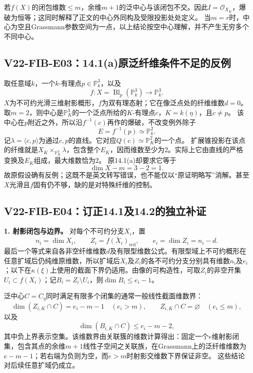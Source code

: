 \documentclass[UTF8,a4paper]{ctexbook}
\begin{document}
若$f(X)$的闭包维数$\leq m$，余维$m+1$的泛中心与该闭包不交。因此$I=\mathcal O_{X_K}$，爆破为恒等；这同时解释了正文的中心外同构及受限投影处处定义。
当$m=r$时，中心为空且Grassmann参数空间为一点，以上结论按空中心理解，并不产生无穷多个不同中心。

\subsection*{V22-FIB-E03：14.1(a)原泛纤维条件不足的反例}

取任意域$k$，一个$k$-有理点$p\in\mathbb P^3_k$，以及
\[
f:X=\operatorname{Bl}_p(\mathbb P^3_k)\longrightarrow\mathbb P^3_k.
\]
$X$为不可约光滑三维射影概形，$f$为双有理态射；它在像泛点处的纤维维数$d=0$。取$m=2$，则中心是$\mathbb P^3_K$的一个泛点所给的$K$-有理点$c$，$K=k(\eta)$，且$c\ne p$。
该中心在$p$附近之外，所以沿$f^{-1}(c)$再作的爆破，不改变例外除子
\[
E=f^{-1}(p)\simeq\mathbb P^2_k.
\]
记$\lambda=\langle c,p\rangle$为通过$c,p$的直线。它对应$Q(c)\simeq\mathbb P^2_K$的一个点。
扩展锥投影在该点的纤维就是$X_K\times_{\mathbb P^3_K}\lambda$，包含整个$E_K$，因而维数至少为2。实际上它由直线的严格变换及$E_K$组成，最大维数恰为2。
原14.1(a)却要求它等于
\[
\dim X-m=3-2=1.
\]
故原假设确有反例；这既不是英文转写错误，也不能仅以“原证明略写”消解。甚至$X$光滑且$f$固有仍不够，缺的是对特殊纤维的控制。

\subsection*{V22-FIB-E04：订正14.1及14.2的独立补证}

\noindent\textbf{1. 射影闭包与边界。}
对每个不可约分支$X_i$，置
\[
n_i=\dim X_i,\qquad Z_i=\overline{f(X_i)}_{\mathrm{red}},
\qquad e_i=\dim Z_i=n_i-d.
\]
最后一个等式来自各非空纤维维数$d$及有限型维数公式。有限型域上不可约概形在任意扩域后仍纯维原维数，所以扩域后$X_i$及$Z_i$的各不可约分支分别具有维数$n_i$及$e_i$；以下在$\kappa(\xi)$上使用的截面下界仍适用。由像的可构造性，可取$Z_i$的非空开集$U_i\subset f(X_i)$；记$B_i=Z_i\setminus U_i$，则$\dim B_i\leq e_i-1$。

泛中心$C=C_\eta$同时满足有限多个闭集的通常一般线性截面维数界：
\[
\dim(Z_{i,K}\cap C)=e_i-m-1\quad(e_i>m),\qquad
Z_{i,K}\cap C=\varnothing\quad(e_i\leq m),
\]
以及
\[
\dim(B_{i,K}\cap C)\leq e_i-m-2,
\]
其中负上界表示空集。该维数界由关联簇的维数计算得出：固定一个$e$维射影闭集，包含其点的余维$m+1$线性子空间之关联族，在Grassmann上的泛纤维维数为$e-m-1$；若右端为负则为空，而$e>m$时射影交维数下界保证非空。
这些结论对后续任意扩域仍成立。
\end{document}
